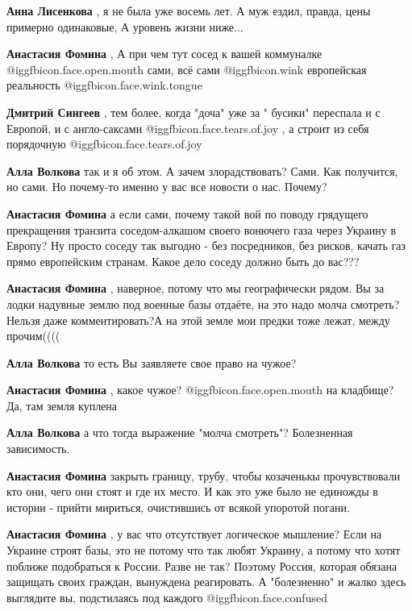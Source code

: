 \begin{itemize}
\begin{itemize}
\textbf{Анна Лисенкова} , я не была уже восемь лет. А муж ездил, правда, цены примерно одинаковые, А уровень жизни ниже...

\textbf{Анастасия Фомина} , А при чем тут сосед к вашей коммуналке  @igg{fbicon.face.open.mouth}  сами, всё сами @igg{fbicon.wink}  европейская реальность @igg{fbicon.face.wink.tongue} 

\textbf{Дмитрий Сингеев} , тем более, когда "доча" уже за " бусики" переспала и с Европой, и с англо-саксами @igg{fbicon.face.tears.of.joy} , а строит из себя порядочную @igg{fbicon.face.tears.of.joy} 

\textbf{Алла Волкова} так и я об этом. А зачем злорадствовать? Сами. Как получится, но сами. Но почему-то именно у вас все новости о нас. Почему?

\textbf{Анастасия Фомина} а если сами, почему такой вой по поводу грядущего прекращения транзита соседом-алкашом своего вонючего газа через Украину в Европу? Ну просто соседу так выгодно - без посредников, без рисков, качать газ прямо европейским странам. Какое дело соседу должно быть до вас???

\textbf{Анастасия Фомина} , наверное, потому что мы географически рядом. Вы за лодки надувные землю под военные базы отдаёте, на это надо молча смотреть? Нельзя даже комментировать?А на этой земле мои предки тоже лежат, между прочим((((

\textbf{Алла Волкова} то есть Вы заявляете свое право на чужое?

\textbf{Анастасия Фомина} , какое чужое?  @igg{fbicon.face.open.mouth}  на кладбище? Да, там земля куплена

\textbf{Алла Волкова} а что тогда выражение "молча смотреть"? Болезненная зависимость.

\textbf{Анастасия Фомина} закрыть границу, трубу, чтобы козаченькы прочувствовали кто они, чего они стоят и где их место. И как это уже было не единожды в истории - прийти мириться, очистившись от всякой упоротой погани.

\textbf{Анастасия Фомина} , у вас что отсутствует логическое мышление? Если на Украине строят базы, это не потому что так любят Украину, а потому что хотят поближе подобраться к России. Разве не так? Поэтому Россия, которая обязана защищать своих граждан, вынуждена реагировать. А "болезненно" и жалко здесь выглядите вы, подстилаясь под каждого @igg{fbicon.face.confused} 


\end{itemize}
\end{itemize}
